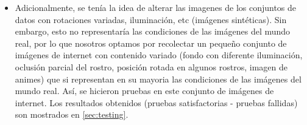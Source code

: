 \begin{itemize}
\item Adicionalmente, se tenía la idea de alterar las imagenes de los conjuntos de datos con rotaciones variadas, iluminación, etc (imágenes sintéticas). Sin embargo, esto no representaría las condiciones de las imágenes del mundo real, por lo que nosotros optamos por recolectar un pequeño conjunto de imágenes de internet con contenido variado (fondo con diferente iluminación, oclusión parcial del rostro, posición rotada en algunos rostros, imagen de animes) que si representan en su mayoria las condiciones de las imágenes del mundo real. Así, se  hicieron pruebas en este conjunto de imágenes de internet. Los resultados obtenidos (pruebas satisfactorias - pruebas fallidas) son mostrados en \ref{sec:testing}.

\end{itemize}